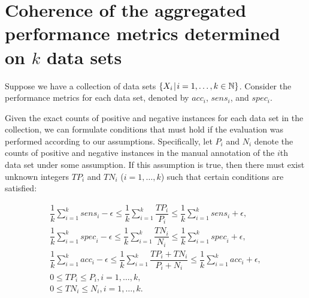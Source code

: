 \documentclass[3p,times]{elsarticle}
\begin{document}
\section{Coherence of the aggregated performance metrics determined on $k$ data sets}

Suppose we have a collection of data sets $\{X_i \hskip 1pt\vert\hskip 1pt i=1,\dots,k\in\mathbb{N}\}$. Consider the performance metrics for each data set, denoted by $acc_i$, $sens_i$, and $spec_i$.

Given the exact counts of positive and negative instances for each data set in the collection, we can formulate conditions that must hold if the evaluation was performed according to our assumptions. Specifically, let $P_i$ and $N_i$ denote the counts of positive and negative instances in the manual annotation of the $i$th data set under some assumption. If this assumption is true, then there must exist unknown integers $TP_i$ and $TN_i$ ($i=1, \dots, k$) such that certain conditions are satisfied:

\begin{align}
\dfrac{1}{k}\sum\limits_{i=1}^k{sens_i} - \epsilon \leq \dfrac{1}{k}\sum\limits_{i=1}^{k}\dfrac{TP_i}{P_i} \leq \dfrac{1}{k}\sum\limits_{i=1}^k{sens_i} + \epsilon, \label{cond-sens}\\
\dfrac{1}{k}\sum\limits_{i=1}^k{spec}_i - \epsilon \leq \dfrac{1}{k}\sum\limits_{i=1}^{k}\dfrac{TN_i}{N_i} \leq \dfrac{1}{k}\sum\limits_{i=1}^k{spec}_i + \epsilon, \label{cond-spec}\\
\dfrac{1}{k}\sum\limits_{i=1}^k{acc}_i - \epsilon \leq \dfrac{1}{k}\sum\limits_{i=1}^{k}\dfrac{TP_i + TN_i}{P_i + N_i} \leq \dfrac{1}{k}\sum\limits_{i=1}^k{acc}_i + \epsilon, \label{cond-acc}\\
0 \leq TP_i \leq P_i, i=1, \dots, k, \label{boundary-tp}\\
0 \leq TN_i \leq N_i, i=1, \dots, k. \label{boundary-tn}
\end{align}
\end{document}
